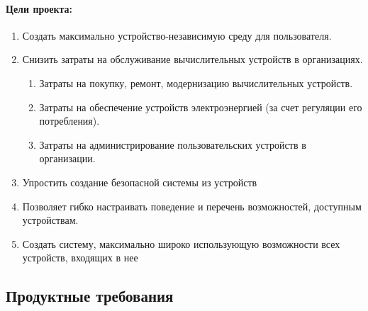 \paragraph*{Цели проекта:}
\begin{enumerate}
   \item Создать максимально устройство-независимую среду для пользователя.
   \item Снизить затраты на обслуживание вычислительных устройств в организациях.
         \begin{enumerate}[label*={\arabic*.}]
            \item Затраты на покупку, ремонт, модернизацию вычислительных устройств.
            \item Затраты на обеспечение устройств электроэнергией (за счет регуляции его потребления).
            \item Затраты на администрирование пользовательских устройств в организации.
         \end{enumerate}
   \item Упростить создание безопасной системы из устройств
   \item Позволяет гибко настраивать поведение и перечень возможностей, доступным устройствам.
   \item Создать систему, максимально широко использующую возможности всех устройств, входящих в нее
\end{enumerate}
\subsection*{Продуктные требования}
